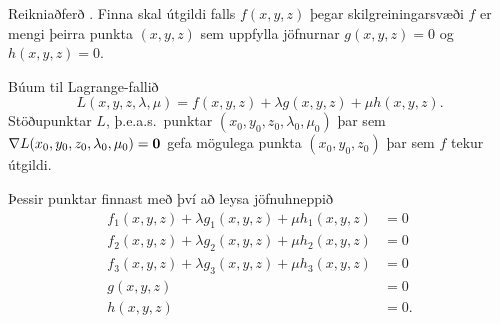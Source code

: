 \begin{frame}{} 

\begin {block}{Reikniaðferð \kaflanr.}
Finna skal útgildi falls $f(x,y,z)$ þegar skilgreiningarsvæði $f$ er mengi þeirra punkta $(x,y,z)$ sem uppfylla jöfnurnar $g(x,y,z)=0$ og $h(x,y,z)=0$.  

Búum til Lagrange-fallið
$$L(x,y,z,\lambda,\mu)=f(x,y,z)+\lambda g(x,y,z)+\mu h(x,y,z).$$
Stöðupunktar $L$, þ.e.a.s.~punktar $(x_0,y_0,z_0,\lambda_0,\mu_0)$ þar sem $\nabla L(x_0,y_0,z_0,\lambda_0,\mu_0)=\mbox{${\bf 0}$}$ gefa mögulega punkta $(x_0,y_0,z_0)$ þar sem $f$ tekur útgildi.

Þessir punktar finnast með því að leysa jöfnuhneppið
\begin{align*}
f_1(x,y,z)+\lambda g_1(x,y,z)+\mu h_1(x,y,z)&=0\\
f_2(x,y,z)+\lambda g_2(x,y,z)+\mu h_2(x,y,z)&=0\\
f_3(x,y,z)+\lambda g_3(x,y,z)+\mu h_3(x,y,z)&=0\\
g(x,y,z)&=0\\
h(x,y,z)&=0.
\end{align*}
\end{block}

\end{frame}




